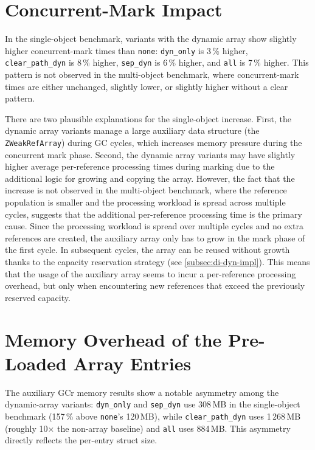 \section{Concurrent-Mark Impact}
\label{sec:disc-mark}

In the single-object benchmark, variants with the dynamic array show slightly higher concurrent-mark times than \texttt{none}: \texttt{dyn\_only} is 3\,\% higher, \texttt{clear\_path\_dyn} is 8\,\% higher, \texttt{sep\_dyn} is 6\,\% higher, and \texttt{all} is 7\,\% higher. This pattern is not observed in the multi-object benchmark, where concurrent-mark times are either unchanged, slightly lower, or slightly higher without a clear pattern.

There are two plausible explanations for the single-object increase. First, the dynamic array variants manage a large auxiliary data structure (the \texttt{ZWeakRefArray}) during \ac{GC} cycles, which increases memory pressure during the concurrent mark phase. Second, the dynamic array variants may have slightly higher average per-reference processing times during marking due to the additional logic for growing and copying the array. However, the fact that the increase is not observed in the multi-object benchmark, where the reference population is smaller and the processing workload is spread across multiple cycles, suggests that the additional per-reference processing time is the primary cause. Since the processing workload is spread over multiple cycles and no extra references are created, the auxiliary array only has to grow in the mark phase of the first cycle. In subsequent cycles, the array can be reused without growth thanks to the capacity reservation strategy (see \cref{subsec:di-dyn-impl}). This means that the usage of the auxiliary array seems to incur a per-reference processing overhead, but only when encountering new references that exceed the previously reserved capacity.

\section{Memory Overhead of the Pre-Loaded Array Entries}
\label{sec:disc-mem}

The auxiliary \ac{GCr} memory results show a notable asymmetry among the dynamic-array variants: \texttt{dyn\_only} and \texttt{sep\_dyn} use 308\,MB in the single-object benchmark (157\,\% above \texttt{none}'s 120\,MB), while \texttt{clear\_path\_dyn} uses 1\,268\,MB (roughly 10$\times$ the non-array baseline) and \texttt{all} uses 884\,MB. This asymmetry directly reflects the per-entry struct size.

